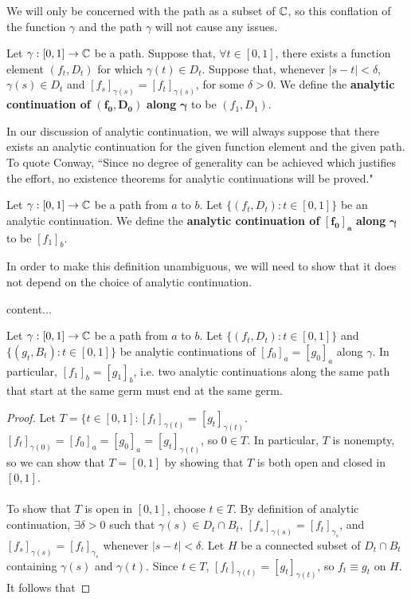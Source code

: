 \documentclass{article}
\begin{document}
We will only be concerned with the path as a subset of $\mathbb{C}$, so this conflation of the function $\gamma$ and the path $\gamma$ will not cause any issues.

\begin{definition}
	Let $\gamma:[0, 1]\rightarrow\mathbb{C}$ be a path. Suppose that, $\forall t\in[0, 1]$, there exists a function element $(f_t, D_t)$ for which $\gamma(t)\in D_t$. Suppose that, whenever $|s-t|<\delta$, $\gamma(s)\in D_t$ and $[f_s]_{\gamma(s)} = [f_t]_{\gamma(s)}$, for some $\delta > 0$. We define the \textbf{analytic continuation of} $\boldsymbol{(f_0, D_0)}$ \textbf{along} $\boldsymbol\gamma$ to be $(f_1, D_1)$.
\end{definition}

In our discussion of analytic continuation, we will always suppose that there exists an analytic continuation for the given function element and the given path. To quote Conway, ``Since no degree of generality can be achieved which justifies the effort, no existence theorems for analytic continuations will be proved."

\begin{definition}
	Let $\gamma:[0, 1]\rightarrow\mathbb{C}$ be a path from $a$ to $b$. Let $\{(f_t, D_t) : t\in[0, 1]\}$ be an analytic continuation. We define the \textbf{analytic continuation of} $\boldsymbol{[f_0]_a}$ \textbf{along} $\boldsymbol\gamma$ to be $[f_1]_b$.
\end{definition}

In order to make this definition unambiguous, we will need to show that it does not depend on the choice of analytic continuation.

\begin{lemma}
	content...
\end{lemma}

\begin{proposition}
	Let $\gamma:[0, 1]\rightarrow\mathbb{C}$ be a path from $a$ to $b$. Let $\{(f_t, D_t): t\in[0, 1]\}$ and $\{(g_t, B_t): t\in[0, 1]\}$ be analytic continuations of $[f_0]_a=[g_0]_a$ along $\gamma$. In particular, $[f_1]_b = [g_1]_b$, i.e. two analytic continuations along the same path that start at the same germ must end at the same germ.
\end{proposition}

\begin{proof}
	Let $T = \{t\in[0, 1]:[f_t]_{\gamma(t)} = [g_t]_{\gamma(t)}$. $[f_t]_{\gamma(0)} = [f_0]_a = [g_0]_a = [g_t]_{\gamma(t)}$, so $0\in T$. In particular, $T$ is nonempty, so we can show that $T = [0, 1]$ by showing that $T$ is both open and closed in $[0, 1]$.\\\\
	To show that $T$ is open in $[0, 1]$, choose $t\in T$. By definition of analytic continuation, $\exists\delta>0$ such that $\gamma(s)\in D_t\cap B_t$, $[f_s]_{\gamma(s)} = [f_t]_{\gamma_s}$, and $[f_s]_{\gamma(s)} = [f_t]_{\gamma_s}$ whenever $|s-t|<\delta$. Let $H$ be a connected subset of $D_t\cap B_t$ containing $\gamma(s)$ and $\gamma(t)$. Since $t\in T$, $[f_t]_{\gamma(t)} = [g_t]_{\gamma(t)}$, so $f_t\equiv g_t$ on $H$. It follows that 
\end{proof}
\end{document}
